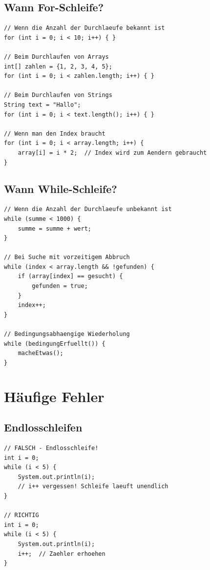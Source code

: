 \subsection*{Wann For-Schleife?}
\begin{lstlisting}
// Wenn die Anzahl der Durchlaeufe bekannt ist
for (int i = 0; i < 10; i++) { }

// Beim Durchlaufen von Arrays
int[] zahlen = {1, 2, 3, 4, 5};
for (int i = 0; i < zahlen.length; i++) { }

// Beim Durchlaufen von Strings
String text = "Hallo";
for (int i = 0; i < text.length(); i++) { }

// Wenn man den Index braucht
for (int i = 0; i < array.length; i++) {
    array[i] = i * 2;  // Index wird zum Aendern gebraucht
}
\end{lstlisting}

\subsection*{Wann While-Schleife?}
\begin{lstlisting}
// Wenn die Anzahl der Durchlaeufe unbekannt ist
while (summe < 1000) {
    summe = summe + wert;
}

// Bei Suche mit vorzeitigem Abbruch
while (index < array.length && !gefunden) {
    if (array[index] == gesucht) {
        gefunden = true;
    }
    index++;
}

// Bedingungsabhaengige Wiederholung
while (bedingungErfuellt()) {
    macheEtwas();
}
\end{lstlisting}

\newpage


\section*{Häufige Fehler}

\subsection*{Endlosschleifen}

\begin{lstlisting}
// FALSCH - Endlosschleife!
int i = 0;
while (i < 5) {
    System.out.println(i);
    // i++ vergessen! Schleife laeuft unendlich
}

// RICHTIG
int i = 0;
while (i < 5) {
    System.out.println(i);
    i++;  // Zaehler erhoehen
}
\end{lstlisting}

